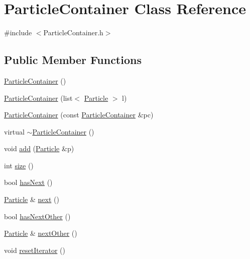 \hypertarget{classParticleContainer}{\section{Particle\+Container Class Reference}
\label{classParticleContainer}
}


{\ttfamily \#include $<$Particle\+Container.\+h$>$}

\subsection*{Public Member Functions}
\begin{DoxyCompactItemize}
\item 
\hyperlink{classParticleContainer_a76d21bdb5141158cf664d65e2d8b1db7}{Particle\+Container} ()
\item 
\hyperlink{classParticleContainer_a03d73336594a38f1cc774d7184db737b}{Particle\+Container} (list$<$ \hyperlink{classParticle}{Particle} $>$ l)
\item 
\hyperlink{classParticleContainer_a2141e6ca39db88b9571ea353226cf9be}{Particle\+Container} (const \hyperlink{classParticleContainer}{Particle\+Container} \&pc)
\item 
virtual \hyperlink{classParticleContainer_a9629a8d31a3aa8c2fe944307c1263b66}{$\sim$\+Particle\+Container} ()
\item 
void \hyperlink{classParticleContainer_a420e21f8a45777015bbfa833dfa2ed71}{add} (\hyperlink{classParticle}{Particle} \&p)
\item 
int \hyperlink{classParticleContainer_ae67310a062690e380c78625b1f944537}{size} ()
\item 
bool \hyperlink{classParticleContainer_a47cc23d69ddbf352b73f6f06721aae5d}{has\+Next} ()
\item 
\hyperlink{classParticle}{Particle} \& \hyperlink{classParticleContainer_a93223e506bbf4e2ce18b29ccb8d1695d}{next} ()
\item 
bool \hyperlink{classParticleContainer_a06a246575051cde2cb5a0400b04ea4af}{has\+Next\+Other} ()
\item 
\hyperlink{classParticle}{Particle} \& \hyperlink{classParticleContainer_a88ef057e640e621f7b6027adaed3653d}{next\+Other} ()
\item 
void \hyperlink{classParticleContainer_a70e1c590d2a9fcc20e66904be4545119}{reset\+Iterator} ()
\end{DoxyCompactItemize}
